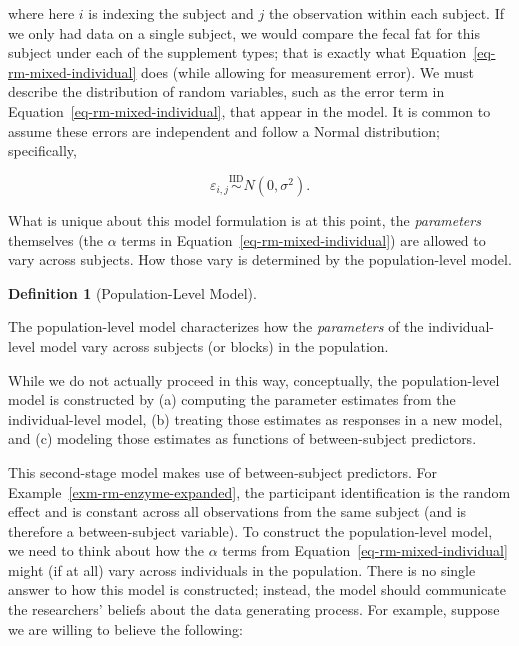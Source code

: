 \documentclass[
  letterpaper,
  DIV=11,
  numbers=noendperiod]{scrreprt}
\theoremstyle{definition}
\newtheorem{definition}{Definition}[chapter]
\theoremstyle{definition}
\theoremstyle{remark}
\begin{document}
where here \(i\) is indexing the subject and \(j\) the observation
within each subject. If we only had data on a single subject, we would
compare the fecal fat for this subject under each of the supplement
types; that is exactly what Equation~\ref{eq-rm-mixed-individual} does
(while allowing for measurement error). We must describe the
distribution of random variables, such as the error term in
Equation~\ref{eq-rm-mixed-individual}, that appear in the model. It is
common to assume these errors are independent and follow a Normal
distribution; specifically,

\[\varepsilon_{i,j} \stackrel{\text{IID}}{\sim} N\left(0, \sigma^2\right).\]

What is unique about this model formulation is at this point, the
\emph{parameters} themselves (the \(\alpha\) terms in
Equation~\ref{eq-rm-mixed-individual}) are allowed to vary across
subjects. How those vary is determined by the population-level model.

\begin{definition}[Population-Level
Model]\protect\hypertarget{def-population-model}{}\label{def-population-model}

The population-level model characterizes how the \emph{parameters} of
the individual-level model vary across subjects (or blocks) in the
population.

\end{definition}

While we do not actually proceed in this way, conceptually, the
population-level model is constructed by (a) computing the parameter
estimates from the individual-level model, (b) treating those estimates
as responses in a new model, and (c) modeling those estimates as
functions of between-subject predictors.

This second-stage model makes use of between-subject predictors. For
Example~\ref{exm-rm-enzyme-expanded}, the participant identification is
the random effect and is constant across all observations from the same
subject (and is therefore a between-subject variable). To construct the
population-level model, we need to think about how the \(\alpha\) terms
from Equation~\ref{eq-rm-mixed-individual} might (if at all) vary across
individuals in the population. There is no single answer to how this
model is constructed; instead, the model should communicate the
researchers' beliefs about the data generating process. For example,
suppose we are willing to believe the following:
\end{document}
